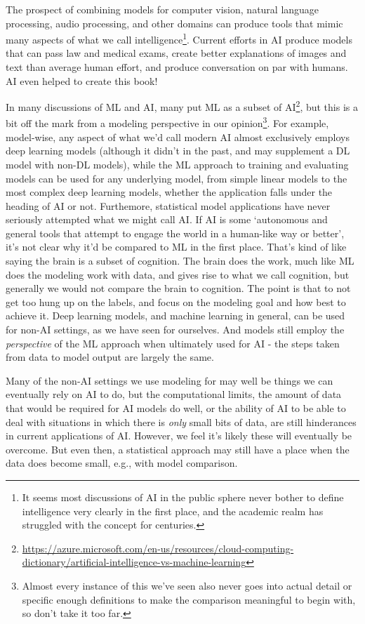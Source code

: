 \documentclass[
  letterpaper,
]{krantz}
\DeclareRobustCommand{\href}[2]{#2\footnote{\url{#1}}}
\begin{document}
The prospect of combining models for computer vision, natural language
processing, audio processing, and other domains can produce tools that
mimic many aspects of what we call intelligence\footnote{It seems most
  discussions of AI in the public sphere never bother to define
  intelligence very clearly in the first place, and the academic realm
  has struggled with the concept for centuries.}. Current efforts in AI
produce models that can pass law and medical exams, create better
explanations of images and text than average human effort, and produce
conversation on par with humans. AI even helped to create this book!

In many discussions of ML and AI,
\href{https://azure.microsoft.com/en-us/resources/cloud-computing-dictionary/artificial-intelligence-vs-machine-learning}{many
put ML as a subset of AI}, but this is a bit off the mark from a
modeling perspective in our opinion\footnote{Almost every instance of
  this we've seen also never goes into actual detail or specific enough
  definitions to make the comparison meaningful to begin with, so don't
  take it too far.}. For example, model-wise, any aspect of what we'd
call modern AI almost exclusively employs deep learning models (although
it didn't in the past, and may supplement a DL model with non-DL
models), while the ML approach to training and evaluating models can be
used for any underlying model, from simple linear models to the most
complex deep learning models, whether the application falls under the
heading of AI or not. Furthemore, statistical model applications have
never seriously attempted what we might call AI. If AI is some
`autonomous and general tools that attempt to engage the world in a
human-like way or better', it's not clear why it'd be compared to ML in
the first place. That's kind of like saying the brain is a subset of
cognition. The brain does the work, much like ML does the modeling work
with data, and gives rise to what we call cognition, but generally we
would not compare the brain to cognition. The point is that to not get
too hung up on the labels, and focus on the modeling goal and how best
to achieve it. Deep learning models, and machine learning in general,
can be used for non-AI settings, as we have seen for ourselves. And
models still employ the \emph{perspective} of the ML approach when
ultimately used for AI - the steps taken from data to model output are
largely the same.

Many of the non-AI settings we use modeling for may well be things we
can eventually rely on AI to do, but the computational limits, the
amount of data that would be required for AI models do well, or the
ability of AI to be able to deal with situations in which there is
\emph{only} small bits of data, are still hinderances in current
applications of AI. However, we feel it's likely these will eventually
be overcome. But even then, a statistical approach may still have a
place when the data does become small, e.g., with model comparison.
\end{document}
